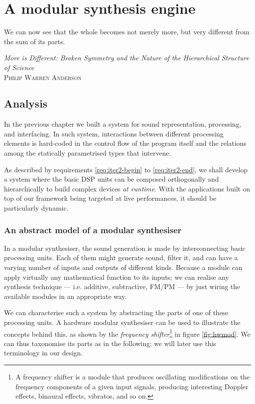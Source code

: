 
\chapter{A modular synthesis engine}

\epigraph{We can now see that the whole becomes not merely more, but
  very different from the sum of its parts.}{\emph{More is Different:
  Broken Symmetry and the Nature of the Hierarchical Structure of
  Science}\\\textsc{Philip Warren Anderson}}

\section{Analysis}

In the previous chapter we built a system for sound representation,
processing, and interfacing. In such system, interactions
between different processing elements is hard-coded in the control
flow of the program itself and the relations among the statically
parametrised types that intervene.

As described by requirements \ref{req:iter2-begin} to
\ref{req:iter2-end}, we shall develop a system where the basic DSP
units can be composed orthogonally and hierarchically to build complex
devices \emph{at runtime}. With the applications built on top of our
framework being targeted at live performances, it should be
particularly dynamic.

\subsection{An abstract model of a modular synthesiser}

In a modular synthesiser, the sound generation is made by
interconnecting basic processing units. Each of them might generate
sound, filter it, and can have a varying number of inputs and outputs
of different kinds. Because a module can apply virtually any
mathematical function to its inputs; we can realise any synthesis
technique --- i.e. additive, subtractive, FM/PM --- by just wiring the
available modules in an appropriate way.

We can characterise such a system by abstracting the parts of one of
these processing units. A hardware modular synthesiser can be used to
illustrate the concepts behind this, as shown by the \emph{frequency
  shifter}\footnote{A frequency shifter is a module that produces
  oscillating modifications on the frequency components of a given
  input signals, producing interesting Doppler effects, binaural
  effects, vibratos, and so on.} in figure \ref{fig:hwmod}. We can thus
taxonomise its parts as in the following; we will later use this
terminology in our design.

